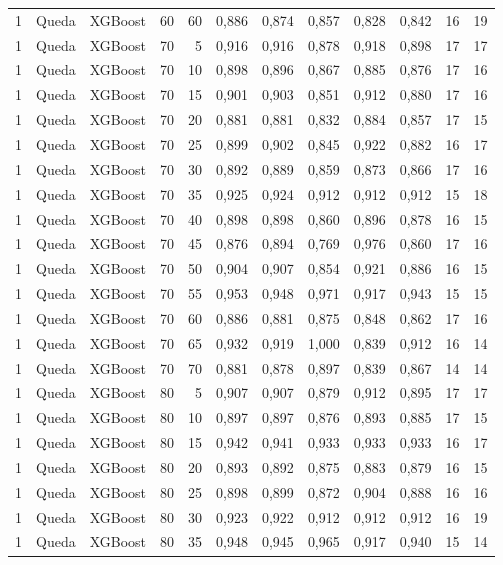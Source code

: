 \begin{longtable}{@{}rllrrrrrrrrr@{}}
1 & Queda & XGBoost & 60 & 60 & 0,886 & 0,874 & 0,857 & 0,828 & 0,842 & 16 & 19 \\
1 & Queda & XGBoost & 70 & 5 & 0,916 & 0,916 & 0,878 & 0,918 & 0,898 & 17 & 17 \\
1 & Queda & XGBoost & 70 & 10 & 0,898 & 0,896 & 0,867 & 0,885 & 0,876 & 17 & 16 \\
1 & Queda & XGBoost & 70 & 15 & 0,901 & 0,903 & 0,851 & 0,912 & 0,880 & 17 & 16 \\
1 & Queda & XGBoost & 70 & 20 & 0,881 & 0,881 & 0,832 & 0,884 & 0,857 & 17 & 15 \\
1 & Queda & XGBoost & 70 & 25 & 0,899 & 0,902 & 0,845 & 0,922 & 0,882 & 16 & 17 \\
1 & Queda & XGBoost & 70 & 30 & 0,892 & 0,889 & 0,859 & 0,873 & 0,866 & 17 & 16 \\
1 & Queda & XGBoost & 70 & 35 & 0,925 & 0,924 & 0,912 & 0,912 & 0,912 & 15 & 18 \\
1 & Queda & XGBoost & 70 & 40 & 0,898 & 0,898 & 0,860 & 0,896 & 0,878 & 16 & 15 \\
1 & Queda & XGBoost & 70 & 45 & 0,876 & 0,894 & 0,769 & 0,976 & 0,860 & 17 & 16 \\
1 & Queda & XGBoost & 70 & 50 & 0,904 & 0,907 & 0,854 & 0,921 & 0,886 & 16 & 15 \\
1 & Queda & XGBoost & 70 & 55 & 0,953 & 0,948 & 0,971 & 0,917 & 0,943 & 15 & 15 \\
1 & Queda & XGBoost & 70 & 60 & 0,886 & 0,881 & 0,875 & 0,848 & 0,862 & 17 & 16 \\
1 & Queda & XGBoost & 70 & 65 & 0,932 & 0,919 & 1,000 & 0,839 & 0,912 & 16 & 14 \\
1 & Queda & XGBoost & 70 & 70 & 0,881 & 0,878 & 0,897 & 0,839 & 0,867 & 14 & 14 \\
1 & Queda & XGBoost & 80 & 5 & 0,907 & 0,907 & 0,879 & 0,912 & 0,895 & 17 & 17 \\
1 & Queda & XGBoost & 80 & 10 & 0,897 & 0,897 & 0,876 & 0,893 & 0,885 & 17 & 15 \\
1 & Queda & XGBoost & 80 & 15 & 0,942 & 0,941 & 0,933 & 0,933 & 0,933 & 16 & 17 \\
1 & Queda & XGBoost & 80 & 20 & 0,893 & 0,892 & 0,875 & 0,883 & 0,879 & 16 & 15 \\
1 & Queda & XGBoost & 80 & 25 & 0,898 & 0,899 & 0,872 & 0,904 & 0,888 & 16 & 16 \\
1 & Queda & XGBoost & 80 & 30 & 0,923 & 0,922 & 0,912 & 0,912 & 0,912 & 16 & 19 \\
1 & Queda & XGBoost & 80 & 35 & 0,948 & 0,945 & 0,965 & 0,917 & 0,940 & 15 & 14 \\

\end{longtable}
